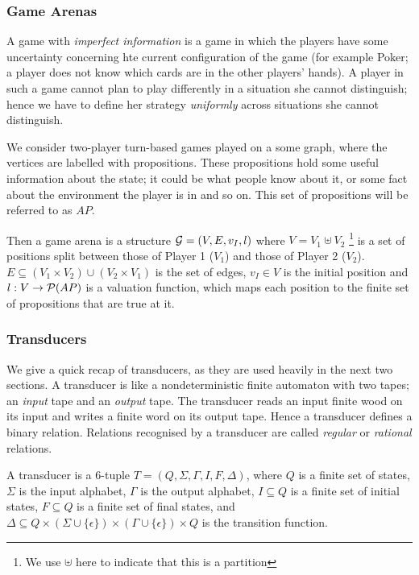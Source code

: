 \documentclass[12pt, a4paper]{article}
\begin{document}
\subsubsection{Game Arenas}

A game with \textit{imperfect information} is a game in which the players have
some uncertainty concerning hte current configuration of the game (for example
Poker; a player does not know which cards are in the other players' hands). A
player in such a game cannot plan to play differently in a situation she cannot
distinguish; hence we have to define her strategy \textit{uniformly} across
situations she cannot distinguish. 

We consider two-player turn-based games played on a some graph, where the
vertices are labelled with propositions. These propositions hold some useful
information about the state; it could be what people know about it, or some fact
about the environment the player is in and so on. This set of propositions will
be referred to as $AP$. 

Then a game arena is a structure $\mathcal{G} = (V, E, v_I, l)$ where $V = V_1 \uplus
V_2$ \footnote{We use $\uplus$ here to indicate that this is a partition} is a
set of positions split between those of Player 1 ($V_1$) and those of Player 2
($V_2$). $E \subseteq (V_1 \times V_2) \cup (V_2 \times V_1)$ is the set of
edges, $v_I \in V$ is the initial position and $l : V \rightarrow \mathcal{P}(AP)$ is
a valuation function, which maps each position to the finite set of propositions
that are true at it.

\subsubsection{Transducers}
\label{subsec:Transducers}

We give a quick recap of transducers, as they are used heavily in the next two
sections. A transducer is like a nondeterministic finite automaton with two
tapes; an \textit{input} tape and an \textit{output} tape. The transducer reads
an input finite wood on its input and writes a finite word on its output tape.
Hence a transducer defines a binary relation. Relations recognised by a
transducer are called \textit{regular} or \textit{rational} relations. 

A transducer is a 6-tuple $T = (Q, \Sigma, \Gamma, I, F, \Delta)$, where $Q$ is
a finite set of states, $\Sigma$ is the input alphabet, $\Gamma$ is the output
alphabet, $I \subseteq Q$ is a finite set of initial states, $F \subseteq Q$ is
a finite set of final states, and $\Delta \subseteq Q \times \left( \Sigma \cup
  \{\epsilon\} \right) \times \left( \Gamma \cup \{\epsilon\} \right) \times Q$
is the transition function.
\end{document}
